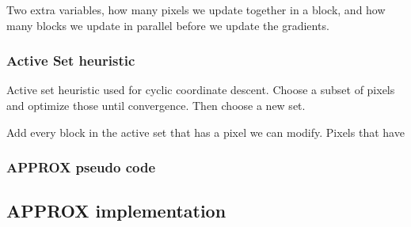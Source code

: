 Two extra variables, how many pixels we update together in a block, and how many blocks we update in parallel before we update the gradients.

\subsubsection{Active Set heuristic}
Active set heuristic used for cyclic coordinate descent. Choose a subset of pixels and optimize those until convergence. Then choose a new set.

Add every block in the active set that has a pixel we can modify.
Pixels that have


\subsubsection{APPROX pseudo code}


\subsection{APPROX implementation}






